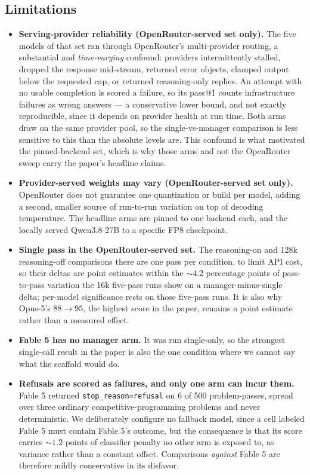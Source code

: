 \documentclass{article}
\begin{document}
\subsection{Limitations}
\label{sec:limitations}

\begin{itemize}
  \item \textbf{Serving-provider reliability (OpenRouter-served set only).} The five models of
  that set ran through OpenRouter's multi-provider routing, a substantial and
  \emph{time-varying} confound: providers intermittently stalled, dropped the response
  mid-stream, returned error objects, clamped output below the requested cap, or returned
  reasoning-only replies. An attempt with no usable completion is scored a failure, so its
  pass@1 counts infrastructure failures as wrong answers --- a conservative lower bound, and not
  exactly reproducible, since it depends on provider health at run time. Both arms draw on the
  same provider pool, so the single-vs-manager comparison is less sensitive to this than the
  absolute levels are. This confound is what motivated the pinned-backend set, which is why
  those arms and not the OpenRouter sweep carry the paper's headline claims.

  \item \textbf{Provider-served weights may vary (OpenRouter-served set only).} OpenRouter does
  not guarantee one quantization or build per model, adding a second, smaller source of
  run-to-run variation on top of decoding temperature. The headline arms are pinned to one
  backend each, and the locally served Qwen3.8-27B to a specific FP8 checkpoint.

  \item \textbf{Single pass in the OpenRouter-served set.} The reasoning-on and 128k
  reasoning-off comparisons there are one pass per condition, to limit API cost, so their deltas
  are point estimates within the ${\sim}4.2$ percentage points of pass-to-pass variation the 16k
  five-pass runs show on a manager-minus-single delta; per-model significance rests on those
  five-pass runs. It is also why Opus-5's $88 \to 95$, the highest score in the paper, remains a
  point estimate rather than a measured effect.

  \item \textbf{Fable 5 has no manager arm.} It was run single-only, so the strongest
  single-call result in the paper is also the one condition where we cannot say what the scaffold
  would do.

  \item \textbf{Refusals are scored as failures, and only one arm can incur them.} Fable 5
  returned \texttt{stop\_reason=refusal} on 6 of 500 problem-passes, spread over three ordinary
  competitive-programming problems and never deterministic. We deliberately configure no fallback
  model, since a cell labeled Fable 5 must contain Fable 5's outcome, but the consequence is that
  its score carries ${\sim}1.2$ points of classifier penalty no other arm is exposed to, as
  variance rather than a constant offset. Comparisons \emph{against} Fable 5 are therefore mildly
  conservative in its disfavor.


\end{itemize}
\end{document}
